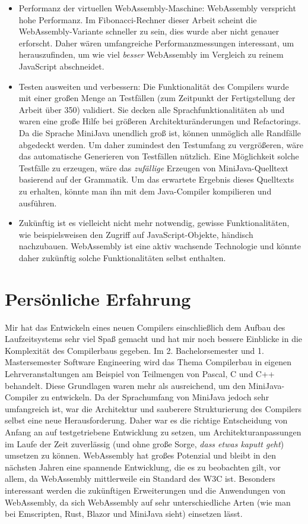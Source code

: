 \begin{itemize}
    \item Performanz der virtuellen WebAssembly-Maschine: WebAssembly verspricht hohe Performanz. Im Fibonacci-Rechner dieser Arbeit scheint die WebAssembly-Variante schneller zu sein, dies wurde aber nicht genauer erforscht. Daher wären umfangreiche Performanzmessungen interessant, um herauszufinden, um wie viel \emph{besser} WebAssembly im Vergleich zu reinem JavaScript abschneidet.
    \item Testen ausweiten und verbessern: Die Funktionalität des Compilers wurde mit einer großen Menge an Testfällen (zum Zeitpunkt der Fertigstellung der Arbeit über 350) validiert. Sie decken alle Sprachfunktionalitäten ab und waren eine große Hilfe bei größeren Architekturänderungen und Refactorings. Da die Sprache MiniJava unendlich groß ist, können unmöglich alle Randfälle abgedeckt werden. Um daher zumindest den Testumfang zu vergrößeren, wäre das automatische Generieren von Testfällen nützlich. Eine Möglichkeit solche Testfälle zu erzeugen, wäre das \emph{zufällige} Erzeugen von MiniJava-Quelltext basierend auf der Grammatik. Um das erwartete Ergebnis dieses Quelltexts zu erhalten, könnte man ihn mit dem Java-Compiler kompilieren und ausführen.
    \item Zukünftig ist es vielleicht nicht mehr notwendig, gewisse Funktionalitäten, wie beispielsweisen den Zugriff auf JavaScript-Objekte, händisch nachzubauen. WebAssembly ist eine aktiv wachsende Technologie und könnte daher zukünftig solche Funktionalitäten selbst enthalten.
\end{itemize}

\section{Persönliche Erfahrung}

Mir hat das Entwickeln eines neuen Compilers einschließlich dem Aufbau des Laufzeitsystems sehr viel Spaß gemacht und hat mir noch bessere Einblicke in die Komplexität des Compilerbaus gegeben. Im 2. Bachelorsemester und 1. Mastersemester Software Engineering wird das Thema Compilerbau in eigenen Lehrveranstaltungen am Beispiel von Teilmengen von Pascal, C und C++ behandelt. Diese Grundlagen waren mehr als ausreichend, um den MiniJava-Compiler zu entwickeln. Da der Sprachumfang von MiniJava jedoch sehr umfangreich ist, war die Architektur und sauberere Strukturierung des Compilers selbst eine neue Herausforderung. Daher war es die richtige Entscheidung von Anfang an auf testgetriebene Entwicklung zu setzen, um Architekturanpassungen im Laufe der Zeit zuverlässig (und ohne große Sorge, \emph{dass etwas kaputt geht}) umsetzen zu können. WebAssembly hat großes Potenzial und bleibt in den nächsten Jahren eine spannende Entwicklung, die es zu beobachten gilt, vor allem, da WebAssembly mittlerweile ein Standard des W3C ist. Besonders interessant werden die zukünftigen Erweiterungen und die Anwendungen von WebAssembly, da sich WebAssembly auf sehr unterschiedliche Arten (wie man bei Emscripten, Rust, Blazor und MiniJava sieht) einsetzen lässt.
